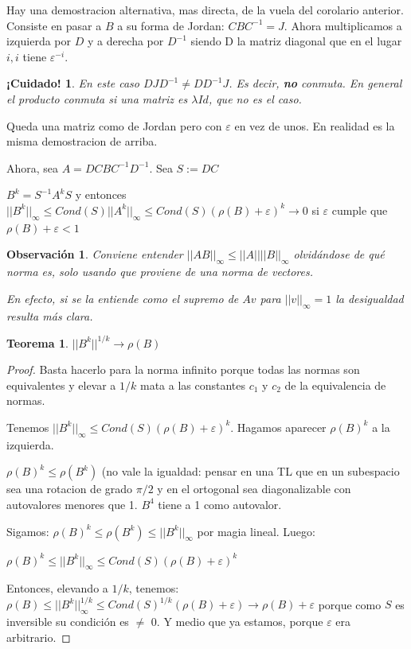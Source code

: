 \documentclass[10pt,a4paper,final]{report}
\newtheorem{theorem}{Teorema}
\newtheorem{observation}{Observación}
\newtheorem{caution}{¡Cuidado!}
\begin{document}
Hay una demostracion alternativa, mas directa, de la vuela del corolario anterior. Consiste en pasar a $B$ a su forma de Jordan: $CBC^{-1} = J$. Ahora multiplicamos a izquierda por $D$ y a derecha por $D^{-1}$ siendo D la matriz diagonal que en el lugar $i,i$ tiene $\varepsilon^{-i}$.

\begin{caution} En este caso $D J D^{-1} \neq D D^{-1} J$. Es decir, \textbf{no} conmuta. En general el producto conmuta si una matriz es $\lambda Id$, que no es el caso.
\end{caution}

Queda una matriz como de Jordan pero con $\varepsilon$ en vez de unos. En realidad es la misma demostracion de arriba.

Ahora, sea $A = DCBC^{-1}D^{-1}$. Sea $S := DC$

$B^k = S^{-1}A^kS$ y entonces $||B^k||_\infty \leq Cond(S) ||A^k||_\infty \leq Cond(S) (\rho(B) + \varepsilon)^k \to 0$ si $\varepsilon$ cumple que $\rho(B)+\varepsilon <1$

\begin{observation}
	Conviene entender $||A B||_\infty \leq ||A|| ||B||_\infty$ olvidándose de qué norma es, solo usando que proviene de una norma de vectores.
	
	En efecto, si se la entiende como el supremo de $Av$ para $||v||_\infty = 1$ la desigualdad resulta más clara.
\end{observation}


\begin{theorem}
    $||B^k||^{1/k} \to \rho(B)$
\end{theorem}


\begin{proof}
    Basta hacerlo para la norma infinito porque todas las normas son equivalentes y elevar a $1/k$ mata a las constantes $c_1$ y $c_2$ de la equivalencia de normas.
    
    
    Tenemos $||B^k||_\infty \leq  Cond(S) (\rho(B) + \varepsilon)^k$. Hagamos aparecer $\rho(B)^k$ a la izquierda.
    
    $\rho(B)^k \leq \rho(B^k)$ (no vale la igualdad: pensar en una TL que en un subespacio sea una rotacion de grado $\pi/2$ y en el ortogonal sea diagonalizable con autovalores menores que 1. $B^4$ tiene a 1 como autovalor.
    
    Sigamos: $\rho(B)^k \leq \rho(B^k) \leq ||B^k||_\infty$ por magia lineal. Luego:
    
    $\rho(B)^k \leq  ||B^k||_\infty \leq  Cond(S) (\rho(B) + \varepsilon)^k$
    
    Entonces, elevando a $1/k$, tenemos: $\rho(B) \leq  ||B^k||_\infty^{1/k} \leq  Cond(S)^{1/k} (\rho(B) + \varepsilon) \to \rho(B) + \varepsilon$ porque como $S$ es inversible su condición es $\neq$ 0. Y medio que ya estamos, porque $\varepsilon$ era arbitrario.
\end{proof}
\end{document}
